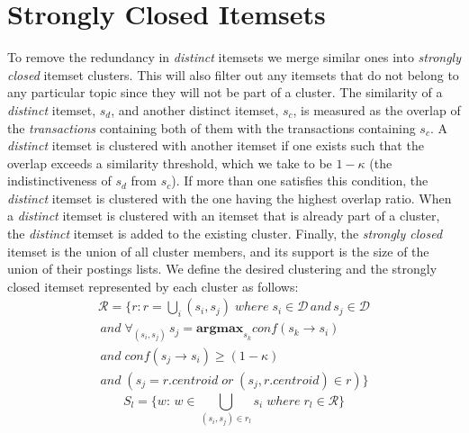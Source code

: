 \documentclass[letterpaper,12pt,titlepage,oneside,final]{book}
\begin{document}



\normalsize

\section{Strongly Closed Itemsets}
To remove the redundancy in \emph{distinct} itemsets we merge similar ones
into \emph{strongly closed} itemset clusters.
This will also filter out any itemsets %
that do not belong to any particular topic
since they will not be part of a cluster.
The similarity of a \emph{distinct} itemset,
$s_d$, and another distinct itemset, $s_c$,
is measured as the overlap of the \emph{transactions} containing both of them
with the transactions containing $s_c$. 
A \emph{distinct} itemset is clustered with another itemset if one exists
such that the overlap exceeds a similarity threshold,
which we take to be $1-\kappa$ (the indistinctiveness of $s_d$ from $s_c$).
If more than one satisfies this condition,
the  \emph{distinct} itemset is clustered with the one having the highest
overlap ratio.
When  a \emph{distinct} itemset is clustered with an itemset that is already
part of a cluster, the \emph{distinct} itemset is added to the existing cluster.
Finally, the \emph{strongly closed} itemset is the union of all cluster members,
and its support is the size of the union of their postings lists.
We define the  desired clustering  and the strongly closed itemset
represented by each cluster as follows:
\begin{align*}\label{eq:strongClosedFormal}
\mathcal{R} = \{r: r = \bigcup_i{(s_i, s_j)}\; where\; s_i \in \mathcal{D} \, and \, s_j \in \mathcal{D} 
\\\,and\; \forall_{(s_i,s_j)} \, s_j = \textbf{argmax}_{s_k} conf(s_k \rightarrow s_i) \\\,and \;conf(s_j \rightarrow s_i) \ge (1-\kappa)
\\\, and\;( s_j = r.centroid\; or \; (s_j, r.centroid) \in r )\}
\end{align*}
\begin{equation}S_l = \{w:\, w \in \bigcup_{(s_i, s_j) \in r_l}{s_i} \; where \; r_l \in \mathcal{R}\}\end{equation}
\end{document}
